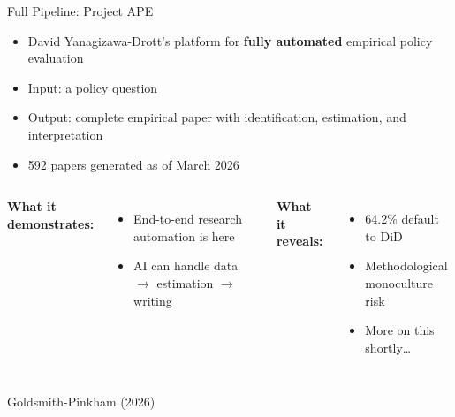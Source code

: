 \documentclass[aspectratio=169, 11pt]{beamer}
\newcommand{\emphgold}[1]{\alert{\textbf{#1}}}
\newcommand{\sourceref}[1]{\vspace{0.15cm}\hfill{\tiny\textcolor{medgray}{#1}}}
\begin{document}
\begin{frame}[shrink=5]{Full Pipeline: Project APE}
\begin{keyinsight}
\begin{itemize}
  \item David Yanagizawa-Drott's platform for \emphgold{fully automated} empirical policy evaluation
  \item Input: a policy question
  \item Output: complete empirical paper with identification, estimation, and interpretation
  \item 592 papers generated as of March 2026
\end{itemize}
\end{keyinsight}
\vspace{0.3cm}
\begin{columns}[T]
\textbf{What it demonstrates:}
\begin{itemize}
  \item End-to-end research automation is here
  \item AI can handle data $\rightarrow$ estimation $\rightarrow$ writing
\end{itemize}

\textbf{What it reveals:}
\begin{itemize}
  \item 64.2\% default to DiD
  \item Methodological monoculture risk
  \item More on this shortly\ldots
\end{itemize}
\end{columns}
\sourceref{Goldsmith-Pinkham (2026)}
\end{frame}
\end{document}
